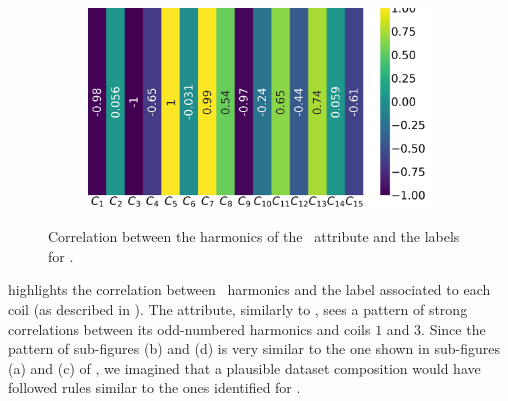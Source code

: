 \begin{figure}[!ht]
\begin{subfigure}{0.49\linewidth}
	\end{subfigure}
	\begin{subfigure}{0.49\linewidth}
		\includegraphics[width=\linewidth]{img/qlp_corr/Bn_coil3.png}
	\end{subfigure}
	\caption{Correlation between the harmonics of the \bn\ attribute and the labels for \qlp.}
	\label{fig:bn-lcorr-qlp}
\end{figure}

 highlights the correlation between \bn\ harmonics and the label associated
to each coil (as described in ). The attribute, similarly to \an, sees a pattern
of strong correlations between its odd-numbered harmonics and coils $1$ and $3$. Since the pattern
of sub-figures (b) and (d) is very similar to the one shown in sub-figures (a) and (c) of
, we imagined that a plausible dataset composition would have followed rules
similar to the ones identified for \an.

